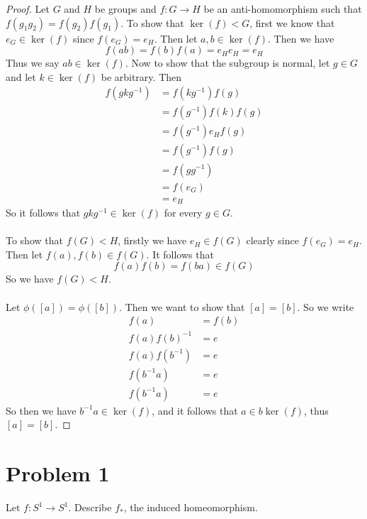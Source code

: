\documentclass{article}
\theoremstyle{definition}
\begin{document}
    \begin{proof}
        Let $G$ and $H$ be groups and $f:G \rightarrow H$ be an anti-homomorphism such that $f(g_1 g_2) = f(g_2)f(g_1)$.
         To show that $\ker(f) < G$, first we know that $e_G \in \ker(f)$ since $f(e_G) = e_H$.
        Then let $a,b \in \ker(f)$. Then we have 
        \[
            f(ab) = f(b)f(a) = e_H e_H = e_H
        \]
        Thus we say $ab \in \ker(f)$. Now to show that the subgroup is normal, let $g \in G$ and let 
        $k \in \ker(f)$ be arbitrary. Then 
        \begin{align*}
            f(gkg^{-1}) & = f(kg^{-1})f(g) \\
            &= f(g^{-1})f(k)f(g) \\
            &= f(g^{-1})e_Hf(g)\\
            &= f(g^{-1})f(g) \\
            &= f(g g^{-1}) \\
            &= f(e_G)\\
            &= e_H
        \end{align*}
        So it follows that $gkg^{-1} \in \ker(f)$ for every $g \in G$.\\\\
         To show that $f(G) < H$, firstly we have $e_H \in f(G)$ clearly since $f(e_G) = e_H$.
        Then let $f(a),f(b) \in f(G)$. It follows that 
        \[
            f(a)f(b) = f(ba) \in f(G)
        \]
        So we have $f(G) < H$.\\\\
         Let $\phi([a]) = \phi([b])$. Then we want to show that $[a] = [b]$. So we write 
        \begin{align*}
            f(a) & = f(b) \\
            f(a)f(b)^{-1} & = e \\
            f(a)f(b^{-1}) & = e \\
            f(b^{-1}a) & = e \\
            f(b^{-1}a) & = e
        \end{align*}
        So then we have $b^{-1}a \in \ker(f)$, and it follows that $a \in b\ker(f)$, thus $[a] = [b]$.
    \end{proof}
\section*{Problem 1}
    Let $f:S^1\rightarrow S^1$. Describe $f_*$, the induced homeomorphism.
\end{document}
